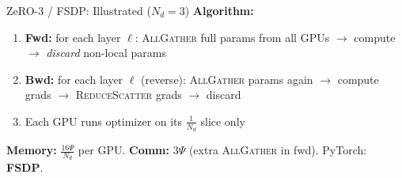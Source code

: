 \begin{frame}{ZeRO-3 / FSDP: Illustrated ($N_d = 3$)}
  {\small\textbf{Algorithm:}}
  \begin{enumerate}\small\setlength{\itemsep}{0pt}\setlength{\parskip}{0pt}
    \item \textbf{Fwd:} for each layer $\ell$: \textsc{AllGather} full params from all GPUs $\to$ compute $\to$ \emph{discard} non-local params
    \item \textbf{Bwd:} for each layer $\ell$ (reverse): \textsc{AllGather} params again $\to$ compute grads $\to$ \textsc{ReduceScatter} grads $\to$ discard
    \item Each GPU runs optimizer on its $\frac{1}{N_d}$ slice only
  \end{enumerate}
  {\small\textbf{Memory:} $\tfrac{16\Psi}{N_d}$ per GPU.
  \quad \textbf{Comm:} $3\Psi$ (extra \textsc{AllGather} in fwd).
  \quad PyTorch: \textbf{FSDP}.}
\end{frame}

